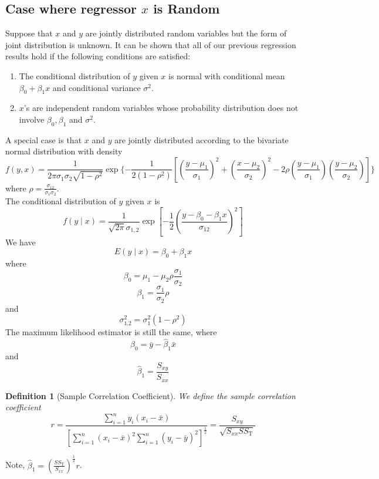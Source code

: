 \documentclass[11pt]{article}
\newtheorem{definition}{Definition}[section]
\theoremstyle{definition}
\begin{document}
\subsection{Case where regressor {$x$} is Random}
Suppose that $x$ and $y$ are jointly distributed random variables but the form of joint distribution is unknown. It can be shown that all of our previous regression results hold if the following conditions are satisfied:
\begin{enumerate}
  \item The conditional distribution of $y$ given $x$ is normal with conditional mean $\beta_0+\beta_1x$ and conditional variance $\sigma^2$.
  \item $x$'s are independent random variables whose probability distribution does not involve $\beta_0, \beta_1$ and $\sigma^2$.
\end{enumerate}
A special case is that $x$ and $y$ are jointly distributed according to the bivariate normal distribution with density
\[
f(y,x) = \frac{1}{2\pi\sigma_1\sigma_2\sqrt{1-\rho^2}}\exp\{-\frac{1}{2(1-\rho^2)}[(\frac{y-\mu_1}{\sigma_1})^2+(\frac{x-\mu_2}{\sigma_2})^2 -2\rho (\frac{y-\mu_1}{\sigma_1})(\frac{y-\mu_2}{\sigma_2})]\}
\]
where $\rho = \frac{\sigma_{12}}{\sigma_1\sigma_2}$.\\
The conditional distribution of $y$ given $x$ is
\[
f(y\mid x) = \frac{1}{\sqrt{2\pi}\sigma_{1,2}}\exp[-\frac{1}{2}(\frac{y-\beta_0-\beta_1x}{\sigma_{12}})^2]
\]
We have 
\[
E(y\mid x) = \beta_0+\beta_1x
\]
where 
\[
\beta_0 = \mu_1-\mu_2\rho\frac{\sigma_1}{\sigma_2}
\] 
\[
\beta_1 = \frac{\sigma_1}{\sigma_2}\rho
\]
and
\[
\sigma^2_{1.2} = \sigma_1^2(1-\rho^2)
\]
The maximum likelihood estimator is still the same, where
\[
\hat{\beta}_0 = \bar{y}-\hat{\beta}_1\bar{x}
\]
and
\[
\hat{\beta}_1 = \frac{S_{xy}}{S_{xx}}
\]
\begin{definition}[Sample Correlation Coefficient]
\normalfont We define the sample correlation coefficient
\[
r = \frac{\sum_{i=1}^n y_i(x_i-\bar{x})}{[\sum_{i=1}^n (x_i-\bar{x})^2\sum_{i=1}^n (y_i-\bar{y})^2]^{\frac{1}{2}}} = \frac{S_{xy}}{\sqrt{S_{xx}SS_\text{T}}}
\]
\end{definition}
Note, $\hat{\beta}_1 = (\frac{SS_\text{T}}{S_{xx}})^{\frac{1}{2}}r$.\\
\end{document}
